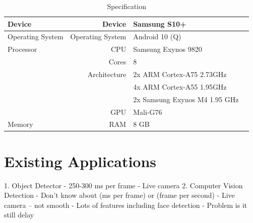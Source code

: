         \begin{table}[!htp]\centering
            \caption{Specification}\label{tab: }
            \scriptsize
            \begin{tabular}{lrll}\toprule
                Device              &Device             &Samsung S10+ \\ \hline
                Operating System    &Operating System   &Android 10 (Q) \\ \hline
                Processor           &CPU                &Samsung Exynos 9820 \\
                                    &Cores              &8 \\
                                    &Architecture       &2x ARM Cortex-A75 2.73GHz \\
                                    &                   &4x ARM Cortex-A55 1.95GHz \\
                                    &                   &2x Samsung Exynos M4 1.95 GHz \\
                                    &GPU                &Mali-G76 \\ \hline
                Memory              &RAM                &8 GB \\
                \bottomrule
            \end{tabular}
        \end{table}


    \section{Existing Applications}
        1.	Object Detector
            -	250-300 ms per frame
            -	Live camera
        2.	Computer Vision Detection
            -	Don’t know about (ms per frame) or (frame per second)
            -	Live camera – not smooth
            -	Lots of features including face detection
            -	Problem is it still delay
